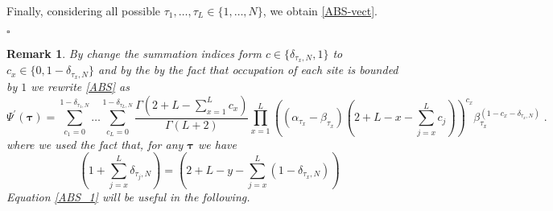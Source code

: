 \documentclass[10pt]{article}
\numberwithin{equation}{section}
\numberwithin{equation}{subsection}
\newtheorem{remark}{Remark}
\newcommand{\dt}{\;.}
\begin{document}
Finally, considering all possible $\tau_{1},\ldots,\tau_{L}\in \{1,\ldots,N\}$, we obtain \eqref{ABS-vect}.
\begin{flushright}
    $\square$
\end{flushright}
\begin{remark} By change the summation indices form $c\in \{\delta_{\tau_{x},N},1\}$ to $c_{x}\in \{0,1-\delta_{\tau_{x},N}\}$ and by the by the fact that occupation of each site is bounded by $1$ we rewrite \eqref{ABS} as 
\begin{equation}\label{ABS_1}
	\Psi^{'}(\bm{\tau})=\sum_{c_{1}=0}^{1-\delta_{\tau_{1},N}}\ldots\sum_{c_{L}=0}^{1-\delta_{\tau_{L},N}}\frac{\Gamma(2+L-\sum_{x=1}^{L}c_{x})}{\Gamma(L+2)}\prod_{x=1}^{L}\left((\alpha_{\tau_{x}}-\beta_{\tau_{x}})\left(2+L-x-\sum_{j=x}^{L}c_{j}\right)\right)^{c_{x}}\beta_{\tau_{x}}^{(1-c_{x}-\delta_{\tau_{x},N})}\dt
\end{equation}
where we used the fact that, for any $\bm{\tau}$ we have 
\begin{equation}
	\left(1+\sum_{j=x}^{L}\delta_{\tau_{j},N}\right) =\left(2+L-y-\sum_{j=x}^{L}(1-\delta_{\tau_{x},N})\right)
\end{equation}
Equation \eqref{ABS_1} will be useful in the following. 
\end{remark}
\end{document}
